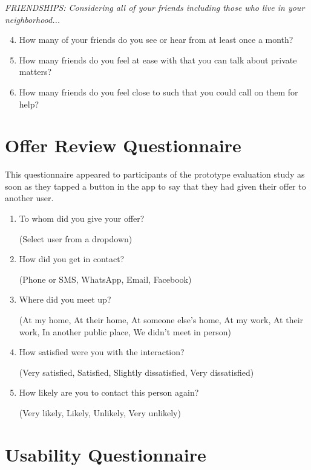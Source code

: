 \noindent \textit{FRIENDSHIPS: Considering all of your friends including those who live in your neighborhood...}
\begin{enumerate}
    \setcounter{enumi}{3}
    \item How many of your friends do you see or hear from at least once a month?
    \item How many friends do you feel at ease with that you can talk about private matters?
    \item How many friends do you feel close to such that you could call on them for help?
\end{enumerate}



\section{Offer Review Questionnaire}
\label{app:questionnaires-review}

This questionnaire appeared to participants of the prototype evaluation study as soon as they tapped a button in the app to say that they had given their offer to another user.

\begin{enumerate}
    \item To whom did you give your offer?

    (Select user from a dropdown)

    \item How did you get in contact?

    (Phone or SMS, WhatsApp, Email, Facebook)

    \item Where did you meet up?

    (At my home, At their home, At someone else's home, At my work, At their work, In another public place, We didn't meet in person)

    \item How satisfied were you with the interaction?

    (Very satisfied, Satisfied, Slightly dissatisfied, Very dissatisfied)

    \item How likely are you to contact this person again?

    (Very likely, Likely, Unlikely, Very unlikely)
\end{enumerate}




\section{Usability Questionnaire}
\label{app:questionnaires-usability}

